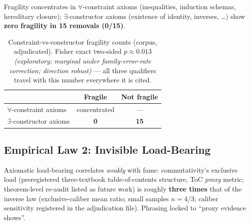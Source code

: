 Fragility concentrates in $\forall$-constraint axioms (inequalities,
induction schemas, hereditary closure); $\exists$-constructor axioms
(existence of identity, inverses, \ldots) show \textbf{zero fragility
in 15 removals (0/15)}.

\begin{table}[h]
\centering
\begin{tabular}{lcc}
\toprule
 & \textbf{Fragile} & \textbf{Not fragile} \\
\midrule
$\forall$-constraint axioms & concentrated & --- \\
$\exists$-constructor axioms & \textbf{0} & \textbf{15} \\
\bottomrule
\end{tabular}
\caption{Constraint-vs-constructor fragility counts (corpus,
adjudicated). Fisher exact two-sided $p \approx 0.013$
\emph{(exploratory; marginal under family-error-rate correction;
direction robust)} --- all three qualifiers travel with this number
everywhere it is cited.}
\end{table}

\subsection{Empirical Law 2: Invisible Load-Bearing}\label{sec:act1-law2}

Axiomatic load-bearing correlates \emph{weakly} with fame:
commutativity's exclusive load (preregistered three-textbook table-of-contents
structure, ToC \emph{proxy} metric; theorem-level re-audit listed as
future work) is roughly \textbf{three times} that of the inverse law
(exclusive-caliber mean ratio; small samples $n=4/3$; caliber
sensitivity registered in the adjudication file). Phrasing locked to
``proxy evidence shows''.
